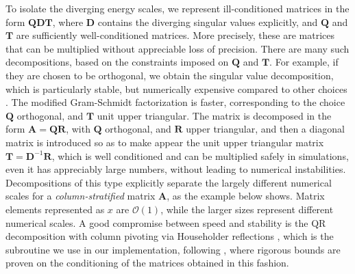 To isolate the diverging energy scales, we represent ill-conditioned matrices in the form $\bm Q \bm D \bm T$, where $\bm D$ contains the diverging singular values explicitly, and $\bm Q$ and $\bm T$ are sufficiently well-conditioned matrices.
More precisely, these are matrices that can be multiplied without appreciable loss of precision.
There are many such decompositions, based on the constraints imposed on $\bm Q$ and $\bm T$.
For example, if they are chosen to be orthogonal, we obtain the singular value decomposition, which is particularly stable, but numerically expensive compared to other choices \cite{hanke_electronic_nodate}.
The modified Gram-Schmidt factorization is faster, corresponding to the choice $\bm Q$ orthogonal, and $\bm T$ unit upper triangular.
The matrix is decomposed in the form $\bm A = \bm Q \bm R$, with $\bm Q$ orthogonal, and $\bm R$ upper triangular, and then a diagonal matrix is introduced so as to make appear the unit upper triangular matrix $\bm  T = \bm D^{-1} \bm R$, which is well conditioned and can be multiplied safely in simulations, even it has appreciably large numbers, without leading to numerical  instabilities.
Decompositions of this type explicitly separate the largely different numerical scales for a \emph{column-stratified} matrix $\bm A$, as the example below shows.
Matrix elements represented as $x$ are $\mathcal{O}(1)$, while the larger sizes represent different numerical scales.
A good compromise between speed and stability is the QR decomposition with column pivoting via Householder reflections \cite{newman_computational_2012}, which is the subroutine we use in our implementation, following \cite{bai_stable_2011}, where rigorous bounds are proven on the conditioning of the matrices obtained in this fashion.
